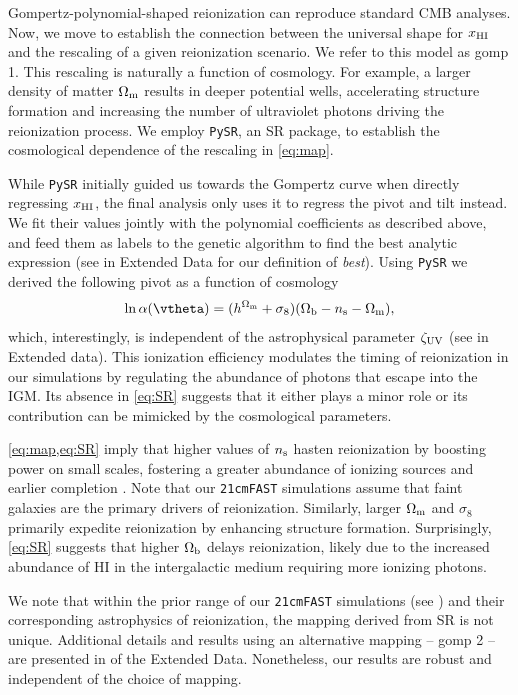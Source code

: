 Gompertz-polynomial-shaped reionization can reproduce standard CMB analyses.
Now, we move to establish the connection
between the universal shape for $x_{\mathrm{HI}}$ and the rescaling of a given
reionization scenario. We refer to this model as gomp 1.
This rescaling is naturally a function of cosmology.
For example, a larger density of matter $\Omega_\mathrm{m}$ results in deeper
potential wells, accelerating structure formation and increasing the
number of ultraviolet photons driving the reionization process.
We employ \texttt{PySR}, an SR package, to establish the cosmological dependence
of the rescaling in \cref{eq:map}.

While \texttt{PySR} initially guided us towards the Gompertz curve when
directly regressing $x_{\mathrm{HI}}$, the final analysis only uses it to regress
the pivot and tilt instead.
We fit their values jointly with the polynomial coefficients as
described above, and feed them as labels to the genetic algorithm to
find the best analytic expression (see  in Extended
Data for our definition of \emph{best}).
Using \texttt{PySR} we derived the following pivot as a function of
cosmology
%
\begin{equation}
\label{eq:SR}
\ln\ap(\vtheta) = (h^{\Omegam} + \sigma_8) (\Omegab - \ns - \Omegam),
\end{equation}
which, interestingly, is independent of the astrophysical parameter $\zeta_\mathrm{UV}$
(see  in Extended data).
This ionization efficiency modulates the timing of reionization in our simulations
by regulating the abundance of photons that escape into the IGM.
Its absence in \cref{eq:SR} suggests that it either plays a minor role
or its contribution can be mimicked by the cosmological parameters.

\cref{eq:map,eq:SR} imply that higher values of $n_\mathrm{s}$ hasten
reionization by boosting power on small scales, fostering a greater
abundance of ionizing sources and earlier completion \cite{Montero2021}.
Note that our \texttt{21cmFAST} simulations assume that faint galaxies
are the primary drivers of reionization.
Similarly, larger $\Omega_\mathrm{m}$ and $\sigma_8$ primarily expedite
reionization by enhancing structure formation.
Surprisingly, \cref{eq:SR} suggests that higher $\Omega_\mathrm{b}$ delays
reionization, likely due to the increased abundance of HI in the
intergalactic medium requiring more ionizing photons.

We note that within the prior range of our \texttt{21cmFAST} simulations
(see ) and their corresponding astrophysics of
reionization, the mapping derived from SR is not unique.
Additional details and results using an alternative mapping -- gomp 2 -- are
presented in  of the Extended Data.
Nonetheless, our results are robust and independent of the choice of
mapping.

